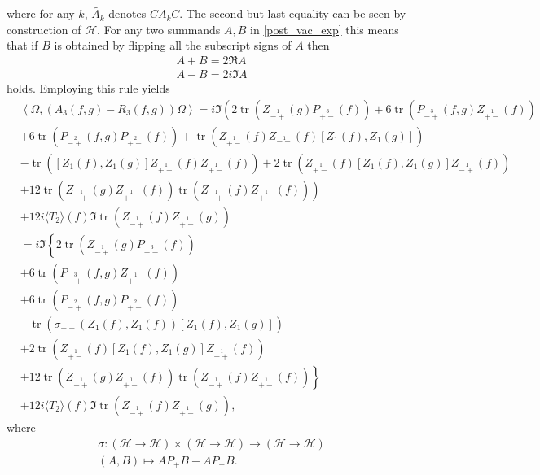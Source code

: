 \documentclass[oneside,reqno,12pt]{amsart}
\DeclareMathOperator{\tr}{tr}
\newcommand{\Z}[2]{Z_{\stackrel{1}{#1}}\left(#2\right)}
\begin{document}
where for any \(k\), \(\tilde{A_k}\) denotes \(C A_k C\). The second but last equality can be seen by construction of \(\overline{\mathcal{H}}\).
For any two summands \(A, B\) in \eqref{post_vac_exp} this means that if \(B\) is obtained by flipping all the subscript signs of \(A\) then 
\begin{align*}
A+B=2 \Re A\\
A-B=2 i \Im A
\end{align*}
holds. Employing this rule yields
\begin{align}\tag*{}
&\left<\Omega, (A_3(f,g)-R_3(f,g))\Omega \right>=
i \Im \left( 2\tr\left(\Z{-+}{g}P_{\stackrel{3}{+-}}(f) \right)
+6 \tr\left(  P_{\stackrel{3}{-+}}(f,g) \Z{+-}{f}\right)\right.\\\tag*{}
&+6 \tr\left(P_{\stackrel{2}{-+}}(f,g) P_{\stackrel{2}{+-}}(f)\right)
+ \tr\left( \Z{+-}{f} \Z{--}{f} \left[Z_1(f),Z_1(g)\right] \right)\\\tag*{}
&- \tr\left(\left[Z_1(f),Z_1(g)\right] \Z{++}{f} \Z{+-}{f} \right)
+2 \tr\left(\Z{+-}{f} \left[Z_1(f),Z_1(g)\right] \Z{-+}{f}\right)\\\tag*{}
&\left.+12 \tr \left(\Z{-+}{g}\Z{+-}{f}\right)\tr\left( \Z{-+}{f} \Z{+-}{f}\right)\right)\\\tag*{}
&+12 i  \langle T_2\rangle(f)\Im  \tr\left(\Z{-+}{f} \Z{+-}{g}\right)\\\label{post_vac1}
&=i \Im \left\{ 2\tr\left(\Z{-+}{g}P_{\stackrel{3}{+-}}(f) \right)\right.\\\label{post_vac2}
&+6 \tr\left(  P_{\stackrel{3}{-+}}(f,g) \Z{+-}{f}\right)\\\label{post_vac3}
&+6 \tr\left(P_{\stackrel{2}{-+}}(f,g) P_{\stackrel{2}{+-}}(f)\right)\\\label{post_vac4}
&- \tr\left( \sigma_{+-}\left(Z_1(f),Z_1(f)\right) \left[Z_1(f),Z_1(g)\right] \right)\\\label{post_vac5}
&+2 \tr\left(\Z{+-}{f} \left[Z_1(f),Z_1(g)\right] \Z{-+}{f}\right)\\\label{post_vac6}
&\left.+12 \tr \left(\Z{-+}{g}\Z{+-}{f}\right)\tr\left( \Z{-+}{f} \Z{+-}{f}\right)\right\}\\\label{post_vac7}
&+12 i  \langle T_2\rangle(f)\Im  \tr\left(\Z{-+}{f} \Z{+-}{g}\right)
,\end{align}
where 
\begin{align*}
\sigma: \left(\mathcal{H}\rightarrow\mathcal{H}\right)\times\left(\mathcal{H}\rightarrow\mathcal{H}\right)\rightarrow \left( \mathcal{H}\rightarrow\mathcal{H}\right)\\
\left(A,B\right)\mapsto A P_+B - AP_- B.
\end{align*}
\end{document}
